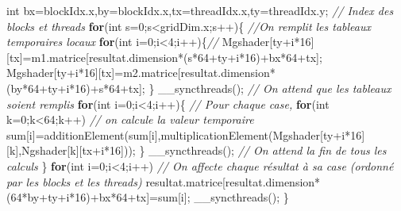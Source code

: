\documentclass[]{article}
\newenvironment{Shaded}{\begin{snugshade}}{\end{snugshade}}
\newcommand{\KeywordTok}[1]{\textcolor[rgb]{0.13,0.29,0.53}{\textbf{{#1}}}}
\newcommand{\DataTypeTok}[1]{\textcolor[rgb]{0.13,0.29,0.53}{{#1}}}
\newcommand{\DecValTok}[1]{\textcolor[rgb]{0.00,0.00,0.81}{{#1}}}
\newcommand{\CommentTok}[1]{\textcolor[rgb]{0.56,0.35,0.01}{\textit{{#1}}}}
\newcommand{\NormalTok}[1]{{#1}}
\begin{document}
\begin{Shaded}
\begin{Highlighting}[]
    \DataTypeTok{int} \NormalTok{bx=blockIdx.x,by=blockIdx.x,tx=threadIdx.x,ty=threadIdx.y; }\CommentTok{// Index des blocks et threads}
    \KeywordTok{for}\NormalTok{(}\DataTypeTok{int} \NormalTok{s=}\DecValTok{0}\NormalTok{;s<gridDim.x;s++)\{ }\CommentTok{//On remplit les tableaux temporaires locaux}
        \KeywordTok{for}\NormalTok{(}\DataTypeTok{int} \NormalTok{i=}\DecValTok{0}\NormalTok{;i<}\DecValTok{4}\NormalTok{;i++)\{}\CommentTok{//}
            \NormalTok{Mgshader[ty+i*}\DecValTok{16}\NormalTok{][tx]=m1.matrice[resultat.dimension*(s*}\DecValTok{64}\NormalTok{+ty+i*}\DecValTok{16}\NormalTok{)+bx*}\DecValTok{64}\NormalTok{+tx];}
            \NormalTok{Mgshader[ty+i*}\DecValTok{16}\NormalTok{][tx]=m2.matrice[resultat.dimension*(by*}\DecValTok{64}\NormalTok{+ty+i*}\DecValTok{16}\NormalTok{)+s*}\DecValTok{64}\NormalTok{+tx];}
        \NormalTok{\}}
        \NormalTok{__syncthreads(); }\CommentTok{// On attend que les tableaux soient remplis}
        \KeywordTok{for}\NormalTok{(}\DataTypeTok{int} \NormalTok{i=}\DecValTok{0}\NormalTok{;i<}\DecValTok{4}\NormalTok{;i++)\{ }\CommentTok{// Pour chaque case,}
            \KeywordTok{for}\NormalTok{(}\DataTypeTok{int} \NormalTok{k=}\DecValTok{0}\NormalTok{;k<}\DecValTok{64}\NormalTok{;k++) }\CommentTok{// on calcule la valeur temporaire}
                \NormalTok{sum[i]=additionElement(sum[i],multiplicationElement(Mgshader[ty+i*}\DecValTok{16}\NormalTok{][k],Ngshader[k][tx+i*}\DecValTok{16}\NormalTok{]));}
        \NormalTok{\}}
        \NormalTok{__syncthreads(); }\CommentTok{// On attend la fin de tous les calculs}
    \NormalTok{\}}
    \KeywordTok{for}\NormalTok{(}\DataTypeTok{int} \NormalTok{i=}\DecValTok{0}\NormalTok{;i<}\DecValTok{4}\NormalTok{;i++) }\CommentTok{// On affecte chaque résultat à sa case (ordonné par les blocks et les threads)}
        \NormalTok{resultat.matrice[resultat.dimension*(}\DecValTok{64}\NormalTok{*by+ty+i*}\DecValTok{16}\NormalTok{)+bx*}\DecValTok{64}\NormalTok{+tx]=sum[i];}
    \NormalTok{__syncthreads();}
\NormalTok{\}}


\end{Highlighting}
\end{Shaded}
\end{document}
